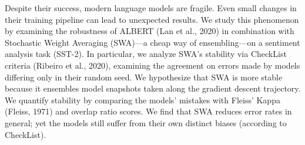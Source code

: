 Despite their success, modern language models are fragile. Even small changes in their training pipeline can lead to unexpected results. We study this phenomenon by examining the robustness of ALBERT (Lan et al., 2020) in combination with Stochastic Weight Averaging (SWA)—a cheap way of ensembling—on a sentiment analysis task (SST-2). In particular, we analyze SWA's stability via CheckList criteria (Ribeiro et al., 2020), examining the agreement on errors made by models differing only in their random seed. We hypothesize that SWA is more stable because it ensembles model snapshots taken along the gradient descent trajectory. We quantify stability by comparing the models' mistakes with Fleiss' Kappa (Fleiss, 1971) and overlap ratio scores. We find that SWA reduces error rates in general; yet the models still suffer from their own distinct biases (according to CheckList).
